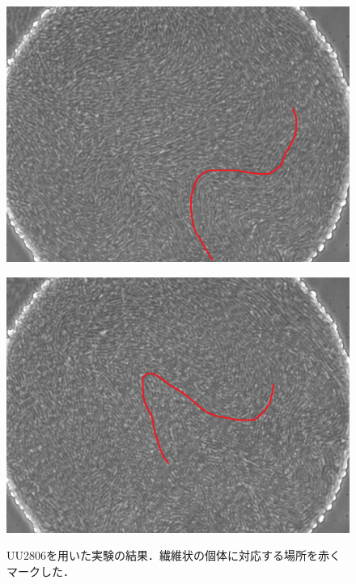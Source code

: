 \documentclass[a4paper,11pt]{jsarticle}
\begin{document}
\begin{figure}[htbp]
\begin{minipage}{0.45\linewidth}
      \includegraphics[width=\columnwidth]{Series015_t150000_RAW_ch00.png}
      \label{fig:06_3_pt}
    \end{minipage}
    \begin{minipage}{0.45\linewidth}
      \centering
      \includegraphics[width=\columnwidth]{Series015_t180000_RAW_ch00.png}
      \label{fig:06_4_pt}
    \end{minipage}
    \caption{UU2806を用いた実験の結果．繊維状の個体に対応する場所を赤くマークした．}
  \end{figure}
  
\end{document}
